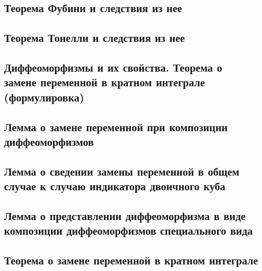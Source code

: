 \documentclass[a4paper]{article}
\theoremstyle{definition}
\theoremstyle{remark}
\begin{document}
    \subsection{ Теорема Фубини и следствия из нее}
    \subsection{ Теорема Тонелли и следствия из нее}
    \subsection{ Диффеоморфизмы и их свойства. Теорема о замене переменной в кратном интеграле (формулировка)}
    \subsection{ Лемма о замене переменной при композиции диффеоморфизмов}
    \subsection{ Лемма о сведении замены переменной в общем случае к случаю индикатора двоичного куба}
    \subsection{ Лемма о представлении диффеоморфизма в виде композиции диффеоморфизмов специального вида}
    \subsection{ Теорема о замене переменной в кратном интеграле}
    
\end{document}

